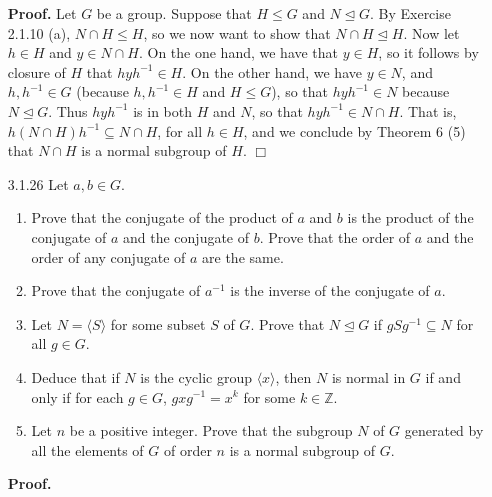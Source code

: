 \documentclass[9pt]{article}
\newcommand{\qed}{\hfill \ensuremath{\Box}}
\newcommand{\cyc}[1]{\langle #1 \rangle}
\newcommand{\Z}{\mathbb{Z}}
\begin{document}
\begin{enumerate}
      \textbf{Proof.} Let $G$ be a group. Suppose that $H \le G$ and
      $N \trianglelefteq G$. By Exercise 2.1.10 (a), $N \cap H \le H$, so we
      now want to show that $N \cap H \trianglelefteq H$. Now let $h \in H$
      and $y \in N \cap H$. On the one hand, we have that $y \in H$, so it
      follows by closure of $H$ that $hyh^{-1} \in H$. On the other hand, we
      have $y \in N$, and $h, h^{-1} \in G$
      (because $h, h^{-1} \in H$ and $H \le G$), so that $hyh^{-1} \in N$
      because $N \trianglelefteq G$. Thus $hyh^{-1}$ is in both $H$ and $N$, so
      that $hyh^{-1} \in N \cap H$. That is,
      $h(N \cap H)h^{-1} \subseteq N \cap H$, for all $h \in H$, and we conclude
      by Theorem 6 (5)  that $N \cap H$ is a normal subgroup of $H$. \qed
   \item[3.1.26]  Let $a, b \in G$.
                  \begin{enumerate}
                     \item Prove that the conjugate of the product of $a$ and
                           $b$ is the product of the conjugate of $a$ and the
                           conjugate of $b$. Prove that the order of $a$ and the
                           order of any conjugate of $a$ are the same.
                     \item Prove that the conjugate of $a^{-1}$ is the inverse
                           of the conjugate of $a$.
                     \item Let $N = \cyc{S}$ for some subset $S$ of $G$. Prove
                           that $N \trianglelefteq G$ if $gSg^{-1} \subseteq N$
                           for all $g \in G$.
                     \item Deduce that if $N$ is the cyclic group $\cyc{x}$,
                           then $N$ is normal in $G$ if and only if for each
                           $g \in G$, $gxg^{-1} = x^k$ for some $k \in \Z$.
                     \item Let $n$ be a positive integer. Prove that the
                           subgroup $N$ of $G$ generated by all the elements of
                           $G$ of order $n$ is a normal subgroup of $G$.
                  \end{enumerate}
     
   \textbf{Proof.}
   

\end{enumerate}
\end{document}
